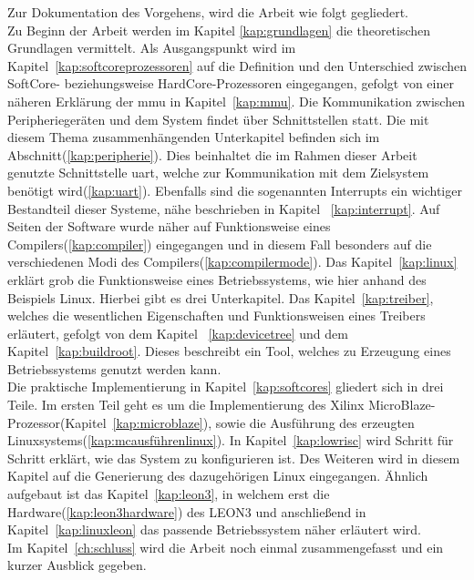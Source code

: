 Zur Dokumentation des Vorgehens, wird die Arbeit wie folgt gegliedert.\\
 Zu Beginn der Arbeit werden im Kapitel \ref{kap:grundlagen} die theoretischen Grundlagen vermittelt. Als
Ausgangspunkt wird im Kapitel~\ref{kap:softcoreprozessoren} auf die Definition und den Unterschied zwischen SoftCore- beziehungsweise HardCore-Prozessoren eingegangen,
gefolgt von einer näheren Erklärung der \ac{mmu} in Kapitel~\ref{kap:mmu}. Die Kommunikation zwischen
Peripheriegeräten und dem System findet über Schnittstellen statt. Die mit diesem Thema zusammenhängenden
Unterkapitel befinden sich im Abschnitt(\ref{kap:peripherie}).
Dies beinhaltet die im Rahmen dieser Arbeit genutzte Schnittstelle \ac{uart}, welche zur Kommunikation mit dem
Zielsystem benötigt wird(\ref{kap:uart}). Ebenfalls sind die sogenannten Interrupts ein wichtiger
Bestandteil dieser Systeme, nähe beschrieben in Kapitel ~\ref{kap:interrupt}.
Auf Seiten der Software wurde näher auf Funktionsweise eines Compilers(\ref{kap:compiler}) eingegangen und in diesem Fall
besonders auf die verschiedenen Modi des Compilers(\ref{kap:compilermode}).
Das Kapitel~\ref{kap:linux} erklärt grob die
Funktionsweise eines Betriebssystems, wie hier anhand des Beispiels Linux. Hierbei gibt es drei Unterkapitel.
Das Kapitel~\ref{kap:treiber}, welches die wesentlichen Eigenschaften und Funktionsweisen
eines Treibers erläutert, gefolgt von dem Kapitel ~\ref{kap:devicetree} und dem Kapitel~\ref{kap:buildroot}.
Dieses beschreibt ein Tool, welches zu Erzeugung
eines Betriebssystems genutzt werden kann.\\
Die praktische Implementierung in Kapitel~\ref{kap:softcores} gliedert sich in drei Teile.
Im ersten Teil geht es um die Implementierung des Xilinx MicroBlaze-Prozessor(Kapitel~\ref{kap:microblaze}),
sowie die Ausführung des erzeugten Linuxsystems(\ref{kap:mcausführenlinux}).
In Kapitel~\ref{kap:lowrisc} wird Schritt für Schritt erklärt, wie das System zu konfigurieren ist. Des Weiteren wird
in diesem Kapitel auf die Generierung des dazugehörigen Linux eingegangen. Ähnlich aufgebaut ist das Kapitel~\ref{kap:leon3}, in welchem
erst die Hardware(\ref{kap:leon3hardware}) des LEON3 und anschließend in Kapitel~\ref{kap:linuxleon} das passende Betriebssystem näher erläutert wird.\\
Im Kapitel~\ref{ch:schluss} wird die Arbeit noch einmal zusammengefasst und ein kurzer Ausblick gegeben.\\
